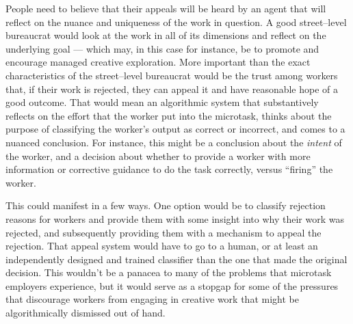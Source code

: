 
People need to believe that their appeals will be heard by an agent that will reflect on the nuance and uniqueness of the work in question.
A good street--level bureaucrat would look at the work in all of its dimensions and reflect on the underlying goal --- which may, in this case for instance, be to promote and encourage managed creative exploration.
More important than the exact characteristics of the street--level bureaucrat would be the trust among workers that, if their work is rejected, they can appeal it and have reasonable hope of a good outcome.
That would mean an algorithmic system that substantively reflects on the effort that the worker put into the microtask,
thinks about the purpose of classifying the worker's output as correct or incorrect, and comes to a nuanced conclusion.
For instance, this might be a conclusion about the \textit{intent} of the worker, and a decision about whether to provide a worker with more information or corrective guidance to do the task correctly, versus ``firing'' the worker.



This could manifest in a few ways.
One option would be to classify rejection reasons for workers and provide them with some insight into why their work was rejected, and subsequently providing them with a mechanism to appeal the rejection.
That appeal system would have to go to a human, or at least an independently designed and trained classifier than the one that made the original decision.
This wouldn't be a panacea to many of the problems that microtask employers experience, but it would serve as a stopgap for some of the pressures that discourage workers from engaging in creative work that might be algorithmically dismissed out of hand.



